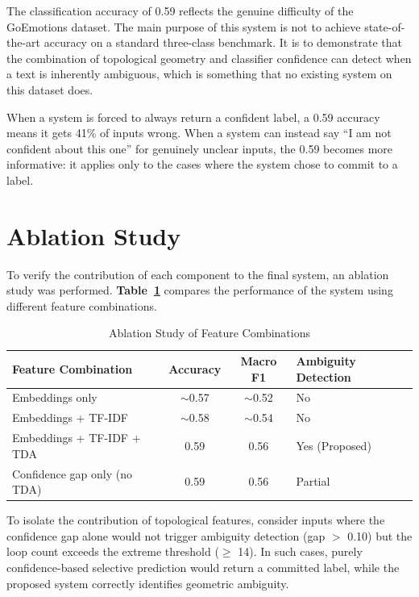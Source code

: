 The classification accuracy of 0.59 reflects the genuine difficulty of the GoEmotions dataset.
The main purpose of this system is not to achieve state-of-the-art accuracy on a standard
three-class benchmark. It is to demonstrate that the combination of topological geometry and
classifier confidence can detect when a text is inherently ambiguous, which is something that
no existing system on this dataset does.

When a system is forced to always return a confident label, a 0.59 accuracy means it gets 41\%
of inputs wrong. When a system can instead say ``I am not confident about this one'' for
genuinely unclear inputs, the 0.59 becomes more informative: it applies only to the cases where
the system chose to commit to a label.

\section{Ablation Study}

To verify the contribution of each component to the final system, an ablation study was performed. \textbf{Table~\ref{tab:ablation}} compares the performance of the system using different feature combinations.

\begin{table}[H]
\centering
\caption{Ablation Study of Feature Combinations}
\label{tab:ablation}
\begin{tabular}{|l|c|c|l|}
\hline
\textbf{Feature Combination} & \textbf{Accuracy} & \textbf{Macro F1} & \textbf{Ambiguity Detection} \\ \hline
Embeddings only              & $\sim$0.57        & $\sim$0.52        & No \\ \hline
Embeddings + TF-IDF          & $\sim$0.58        & $\sim$0.54        & No \\ \hline
Embeddings + TF-IDF + TDA    & 0.59              & 0.56              & Yes (Proposed) \\ \hline
Confidence gap only (no TDA) & 0.59              & 0.56              & Partial \\ \hline
\end{tabular}
\end{table}

To isolate the contribution of topological features, consider inputs where the confidence gap alone would not trigger ambiguity detection (gap $>$ 0.10) but the loop count exceeds the extreme threshold ($\geq$ 14). In such cases, purely confidence-based selective prediction would return a committed label, while the proposed system correctly identifies geometric ambiguity.

